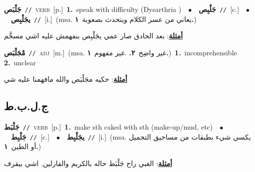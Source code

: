\documentclass[10pt,a4paper,twoside]{article} %
\begin{document}
\begin{multicols}{2}
{\setlength\topsep{0pt}\textbf{\foreignlanguage{arabic}{جَلْبَص}}\ {\color{gray}\texttt{//}\color{black}}\ \textsc{verb}\ [p.]\ \textbf{1.}~speak with difficulty (Dysarthria )\ \ $\bullet$\ \ \setlength\topsep{0pt}\textbf{\foreignlanguage{arabic}{جَلْبِص}}\ {\color{gray}\texttt{//}\color{black}}\ [c.]\ \ $\bullet$\ \ \setlength\topsep{0pt}\textbf{\foreignlanguage{arabic}{يجَلْبِص}}\ {\color{gray}\texttt{//}\color{black}}\ [i.]\ \color{gray}(msa. \foreignlanguage{arabic}{يعاني من عسر الكلام ويتحدث بصعوبة}~\foreignlanguage{arabic}{\textbf{١.}})\color{black}\  \begin{flushright}\color{gray}\foreignlanguage{arabic}{\textbf{\underline{\foreignlanguage{arabic}{أمثلة}}}: بعد الحادق صار عمي يجَلْبِص بنفهمش عليه اشي مسخَّم}\end{flushright}\color{black}} \vspace{2mm}

{\setlength\topsep{0pt}\textbf{\foreignlanguage{arabic}{مْجَلْبَص}}\ {\color{gray}\texttt{//}\color{black}}\ \textsc{adj}\ [m.]\ \color{gray}(msa. \foreignlanguage{arabic}{غير واضِح}~\foreignlanguage{arabic}{\textbf{٢.}}  .\foreignlanguage{arabic}{غير مفهوم}~\foreignlanguage{arabic}{\textbf{١.}})\color{black}\ \textbf{1.}~incomprehensible  \textbf{2.}~unclear\  \begin{flushright}\color{gray}\foreignlanguage{arabic}{\textbf{\underline{\foreignlanguage{arabic}{أمثلة}}}: حكيه مجَلْبَص والله مافهمنا عليه شي}\end{flushright}\color{black}} \vspace{2mm}

\vspace{-3mm}
\subsection*{\color{blue}\foreignlanguage{arabic}{ج.ل.ب.ط}\color{blue}{}} 

{\setlength\topsep{0pt}\textbf{\foreignlanguage{arabic}{جَلْبَط}}\ {\color{gray}\texttt{//}\color{black}}\ \textsc{verb}\ [p.]\ \textbf{1.}~make sth caked with sth (make-up/mud, etc)\ \ $\bullet$\ \ \setlength\topsep{0pt}\textbf{\foreignlanguage{arabic}{جَلْبِط}}\ {\color{gray}\texttt{//}\color{black}}\ [c.]\ \ $\bullet$\ \ \setlength\topsep{0pt}\textbf{\foreignlanguage{arabic}{يجَلْبِط}}\ {\color{gray}\texttt{//}\color{black}}\ [i.]\ \color{gray}(msa. \foreignlanguage{arabic}{يكسي شيء بطبقات من مساحيق التجميل أو الطين}~\foreignlanguage{arabic}{\textbf{١.}})\color{black}\  \begin{flushright}\color{gray}\foreignlanguage{arabic}{\textbf{\underline{\foreignlanguage{arabic}{أمثلة}}}: الغبي راح جَلْبَط حاله بالكريم والفازلين. اشي بيقرف}\end{flushright}\color{black}} \vspace{2mm}


\end{multicols}
\end{document}

